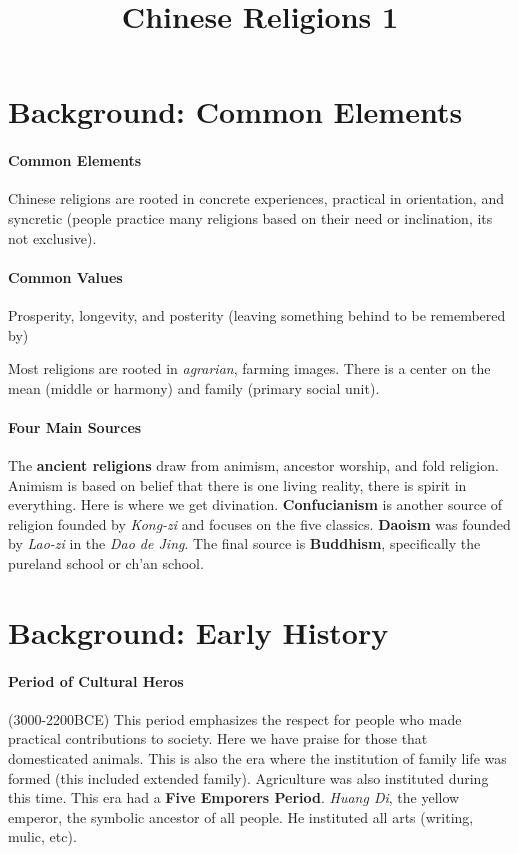 \documentclass{article}
\begin{document}
\title{Chinese Religions 1}
\maketitle
\section*{Background: Common Elements}
\label{sec:background_common_elements}
\paragraph{Common Elements}
\label{par:common_elements}
Chinese religions are rooted in concrete experiences, practical in orientation, and syncretic (people practice many religions based on their need or inclination, its not exclusive).

\paragraph{Common Values}
\label{par:common_values}
Prosperity, longevity, and posterity (leaving something behind to be remembered by)

Most religions are rooted in \emph{agrarian}, farming images. There is a center on the mean (middle or harmony) and family (primary social unit).

\paragraph{Four Main Sources}
\label{par:four_main_sources}
The \textbf{ancient religions} draw from animism, ancestor worship, and fold religion. Animism is based on belief that there is one living reality, there is spirit in everything. Here is where we get divination. \textbf{Confucianism} is another source of religion founded by \emph{Kong-zi} and focuses on the five classics. \textbf{Daoism} was founded by \emph{Lao-zi} in the \emph{Dao de Jing}. The final source is \textbf{Buddhism}, specifically the pureland school or ch'an school.

\section*{Background: Early History}
\label{sec:background_early_history}
\paragraph{Period of Cultural Heros}
\label{par:period_of_cultural_heros}
(3000-2200BCE) This period emphasizes the respect for people who made practical contributions to society. Here we have praise for those that domesticated animals. This is also the era where the institution of family life was formed (this included extended family). Agriculture was also instituted during this time. This era had a \textbf{Five Emporers Period}. \emph{Huang Di}, the yellow emperor, the symbolic ancestor of all people. He instituted all arts (writing, mulic, etc).
\end{document}
